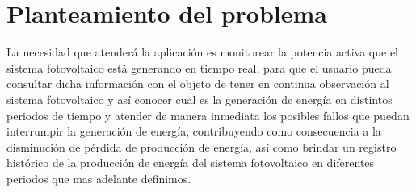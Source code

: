 
\section{Planteamiento del problema}

La necesidad que atenderá la aplicación es monitorear la potencia activa que el sistema fotovoltaico está generando en tiempo real, para que el usuario pueda consultar dicha información con el objeto de tener en continua observación al sistema fotovoltaico y así conocer cual es la generación de energía en distintos periodos de tiempo y atender de manera inmediata los posibles fallos que puedan interrumpir la generación de energía; contribuyendo como consecuencia a la disminución de pérdida de producción de energía, así como brindar un registro histórico de la producción de energía del sistema fotovoltaico en diferentes periodos que mas adelante definimos.

